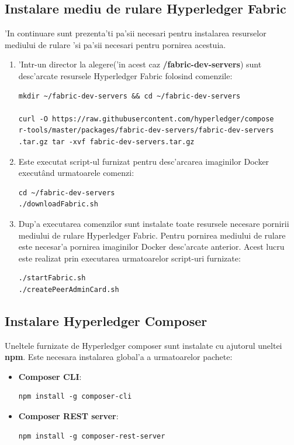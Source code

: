 \documentclass[12pt,a4paper,twoside]{report}
\begin{document}
\subsection{Instalare mediu de rulare Hyperledger Fabric}
    'In continuare sunt prezenta'ti pa'sii necesari pentru instalarea resurselor mediului de rulare 'si pa'sii necesari pentru pornirea acestuia. 
    \begin{enumerate}
        \item 'Intr-un director la alegere('in acest caz \textbf{/fabric-dev-servers}) sunt desc'arcate resursele Hyperledger Fabric folosind comenzile:
    \begin{lstlisting}[backgroundcolor=\color{light-gray}]
mkdir ~/fabric-dev-servers && cd ~/fabric-dev-servers

curl -O https://raw.githubusercontent.com/hyperledger/compose
r-tools/master/packages/fabric-dev-servers/fabric-dev-servers
.tar.gz tar -xvf fabric-dev-servers.tar.gz
    \end{lstlisting}
    
    \item Este executat script-ul furnizat pentru desc'arcarea imaginilor Docker execut\^and urmatoarele comenzi:
    \begin{lstlisting}[backgroundcolor=\color{light-gray}]
cd ~/fabric-dev-servers
./downloadFabric.sh
    \end{lstlisting}
    \item Dup'a executarea comenzilor sunt instalate toate resursele necesare pornirii mediului de rulare Hyperledger Fabric. Pentru pornirea mediului de rulare este necesar'a pornirea imaginilor Docker desc'arcate anterior. Acest lucru este realizat prin executarea urmatoarelor script-uri furnizate:
    \begin{lstlisting}[backgroundcolor=\color{light-gray}]
./startFabric.sh
./createPeerAdminCard.sh
    \end{lstlisting}
    \end{enumerate}

\subsection{Instalare Hyperledger Composer}
    Uneltele furnizate de Hyperledger composer sunt instalate cu ajutorul uneltei \textbf{npm}. Este necesara instalarea global'a a urmatoarelor pachete:
    \begin{itemize}
        \item \textbf{Composer CLI}:
            \begin{lstlisting}[backgroundcolor=\color{light-gray}]
npm install -g composer-cli
            \end{lstlisting}
        \item \textbf{Composer REST server}:
            \begin{lstlisting}[backgroundcolor=\color{light-gray}]
npm install -g composer-rest-server
            \end{lstlisting}
    \end{itemize}
    
\end{document}
